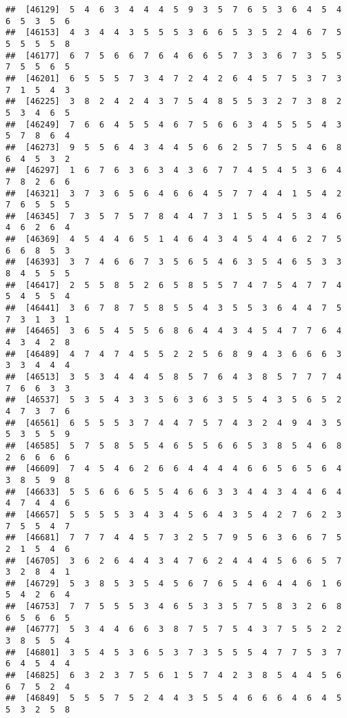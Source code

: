 \documentclass[
]{book}
\begin{document}
\begin{verbatim}
##  [46129]  5  4  6  3  4  4  4  5  9  3  5  7  6  5  3  6  4  5  4  6  5  3  5  6
##  [46153]  4  3  4  4  3  5  5  5  3  6  6  5  3  5  2  4  6  7  5  5  5  5  5  8
##  [46177]  6  7  5  6  6  7  6  4  6  6  5  7  3  3  6  7  3  5  5  7  5  5  6  5
##  [46201]  6  5  5  5  7  3  4  7  2  4  2  6  4  5  7  5  3  7  3  7  1  5  4  3
##  [46225]  3  8  2  4  2  4  3  7  5  4  8  5  5  3  2  7  3  8  2  5  3  4  6  5
##  [46249]  7  6  6  4  5  5  4  6  7  5  6  6  3  4  5  5  5  4  3  5  7  8  6  4
##  [46273]  9  5  5  6  4  3  4  4  5  6  6  2  5  7  5  5  4  6  8  6  4  5  3  2
##  [46297]  1  6  7  6  3  6  3  4  3  6  7  7  4  5  4  5  3  6  4  7  8  2  6  6
##  [46321]  3  7  3  6  5  6  4  6  6  4  5  7  7  4  4  1  5  4  2  7  6  5  5  5
##  [46345]  7  3  5  7  5  7  8  4  4  7  3  1  5  5  4  5  3  4  6  4  6  2  6  4
##  [46369]  4  5  4  4  6  5  1  4  6  4  3  4  5  4  4  6  2  7  5  6  6  8  5  3
##  [46393]  3  7  4  6  6  7  3  5  6  5  4  6  3  5  4  6  5  3  3  8  4  5  5  5
##  [46417]  2  5  5  8  5  2  6  5  8  5  5  7  4  7  5  4  7  7  4  5  4  5  5  4
##  [46441]  3  6  7  8  7  5  8  5  5  4  3  5  5  3  6  4  4  7  5  7  3  1  3  1
##  [46465]  3  6  5  4  5  5  6  8  6  4  4  3  4  5  4  7  7  6  4  4  3  4  2  8
##  [46489]  4  7  4  7  4  5  5  2  2  5  6  8  9  4  3  6  6  6  3  3  3  4  4  4
##  [46513]  3  5  3  4  4  4  5  8  5  7  6  4  3  8  5  7  7  7  4  7  6  6  3  3
##  [46537]  5  3  5  4  3  3  5  6  3  6  3  5  5  4  3  5  6  5  2  4  7  3  7  6
##  [46561]  6  5  5  5  3  7  4  4  7  5  7  4  3  2  4  9  4  3  5  5  3  5  5  9
##  [46585]  5  7  5  8  5  5  4  6  5  5  6  6  5  3  8  5  4  6  8  2  6  6  6  6
##  [46609]  7  4  5  4  6  2  6  6  4  4  4  4  6  6  5  6  5  6  4  3  8  5  9  8
##  [46633]  5  5  6  6  6  5  5  4  6  6  3  3  4  4  3  4  4  6  4  4  7  4  4  6
##  [46657]  5  5  5  5  3  4  3  4  5  6  4  3  5  4  2  7  6  2  3  7  5  5  4  7
##  [46681]  7  7  7  4  4  5  7  3  2  5  7  9  5  6  3  6  6  7  5  2  1  5  4  6
##  [46705]  3  6  2  6  4  4  3  4  7  6  2  4  4  4  5  6  6  5  7  3  2  8  4  1
##  [46729]  5  3  8  5  3  5  4  5  6  7  6  5  4  6  4  4  6  1  6  5  4  2  6  4
##  [46753]  7  7  5  5  5  3  4  6  5  3  3  5  7  5  8  3  2  6  8  6  5  6  6  5
##  [46777]  5  3  4  4  6  6  3  8  7  5  7  5  4  3  7  5  5  2  2  3  8  5  5  4
##  [46801]  3  5  4  5  3  6  5  3  7  3  5  5  5  4  7  7  5  3  7  6  4  5  4  4
##  [46825]  6  3  2  3  7  5  6  1  5  7  4  2  3  8  5  4  4  5  6  6  7  5  2  4
##  [46849]  5  5  5  7  5  2  4  4  3  5  5  4  6  6  6  4  6  4  5  5  3  2  5  8

\end{verbatim}
\end{document}

